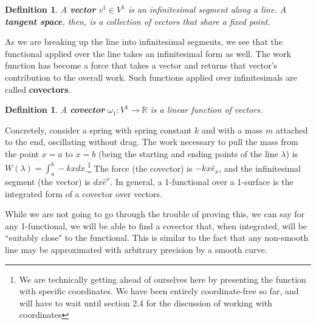 \documentclass{book}
\newtheorem{defn}[equation]{Definition}
\begin{document}
\begin{defn}
	A \textbf{vector} $v^1 \in V^1$ is an infinitesimal segment along a line. A \textbf{tangent space}, then, is a collection of vectors that share a fixed point. 
\end{defn}

As we are breaking up the line into infinitesimal segments, we see that the functional applied over the line takes an infinitesimal form as well. The work function has become a force that takes a vector and returns that vector's contribution to the overall work. Such functions applied over infinitesimals are called \textbf{covectors}. 

\begin{defn}
	A \textbf{covector} $\omega_1 : V^1 \to \mathbb{R}$ is a linear function of vectors. 
\end{defn}

Concretely, consider a spring with spring constant $k$ and with a mass $m$ attached to the end, oscillating without drag. The work necessary to pull the mass from the point $x = a$ to $x = b$ (being the starting and ending points of the line $\lambda$) is $W(\lambda) = \int_a^b -kx dx$.\footnote{We are technically getting ahead of ourselves here by presenting the function with specific coordinates. We have been entirely coordinate-free so far, and will have to wait until section 2.4 for the discussion of working with coordinates} The force (the covector) is $-kx \hat{e}_x$, and the infinitesimal segment (the vector) is $dx \hat{e}^x$. In general, a 1-functional over a 1-surface is the integrated form of a covector over vectors. 










\begin{center}
\end{center}

While we are not going to go through the trouble of proving this, we can say for any 1-functional, we will be able to find a covector that, when integrated, will be ``suitably close" to the functional. This is similar to the fact that any non-smooth line may be approximated with arbitrary precision by a smooth curve. 
\end{document}
